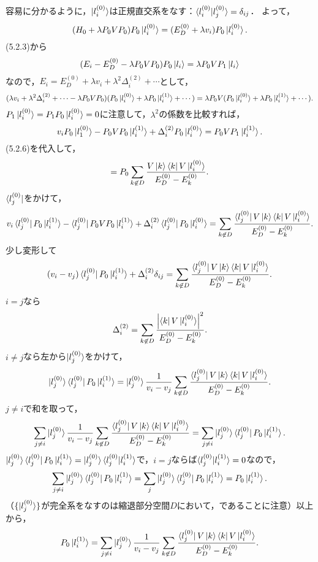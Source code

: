 \documentclass[a4paper]{ltjsreport}
\begin{document}
容易に分かるように，$\ket{l^{(0)}_i}$は正規直交系をなす：$\braket{l_i^{(0)} | l_j^{(0)}} = \delta_{ij}$．
よって，
\[(H_0 + \lambda P_0VP_0) P_0 \ket{l^{(0)}_i} = (E^{(0)}_D + \lambda v_i) P_0 \ket{l^{(0)}_i}.\]
(5.2.3)から
\[(E_i - E_D^{(0)} - \lambda P_0VP_0) P_0 \ket{l_i} =  \lambda P_0VP_1\ket{l_i}\]
なので，$E_i = E_D^{(0)} + \lambda v_i + \lambda^2\Delta_i^{(2)} + \cdots$として，
\[(\lambda v_i + \lambda^2 \Delta_i^{(2)} + \cdots - \lambda P_0VP_0) (P_0\ket{l^{(0)}_i} + \lambda P_0 \ket{l_i^{(1)}} + \cdots) = \lambda P_0V(P_0\ket{l^{(0)}_i} + \lambda P_0\ket{l_i^{(1)}} + \cdots).\]
$P_1\ket{l^{(0)}_i} = P_1P_0\ket{l^{(0)}_i} = 0$に注意して，$\lambda^2$の係数を比較すれば，
\[v_iP_0 \ket{l_1^{(0)}} - P_0VP_0 \ket{l_i^{(1)}} + \Delta_i^{(2)} P_0 \ket{l^{(0)}_i} = P_0VP_1 \ket{l_i^{(1)}}.\]
(5.2.6)を代入して，
\[ = P_0\sum_{k\not\in D} \frac{V \ket{k} \bra{k} V \ket{l^{(0)}_i}}{E_D^{(0)} - E_k^{(0)}}.\]
$\bra{l_j^{(0)}}$をかけて，
\[v_i \bra{l_j^{(0)}} P_0 \ket{l_i^{(1)}} - \bra{l_j^{(0)}} P_0VP_0 \ket{l_i^{(1)}} + \Delta_i^{(2)} \bra{l_j^{(0)}} P_0\ket{l^{(0)}_i} = \sum_{k\not\in D} \frac{\bra{l_j^{(0)}} V\ket{k} \bra{k} V\ket{l^{(0)}_i}}{E_D^{(0)}-E_k^{(0)}}.\]
少し変形して
\[(v_i-v_j) \bra{l_j^{(0)}} P_0 \ket{l_i^{(1)}} + \Delta_i^{(2)} \delta_{ij} = \sum_{k\not\in D} \frac{\bra{l_j^{(0)}} V\ket{k} \bra{k} V \ket{l^{(0)}_i}}{E_D^{(0)} - E_k^{(0)}}.\]
$i = j$なら
\[\Delta_i^{(2)} = \sum_{k\not\in D} \frac{\left\lvert \bra{k} V\ket{l^{(0)}_i}\right\rvert^2}{E_D^{(0)}-E_k^{(0)}}.\]
$i\neq j$なら左から$\ket{l_j^{(0)}}$をかけて，
\[\ket{l_j^{(0)}}\bra{l_j^{(0)}} P_0\ket{l_i^{(1)}} = \ket{l_j^{(0)}}\frac{1}{v_i-v_j} \sum_{k\not\in D} \frac{\bra{l_j^{(0)}} V\ket{k} \bra{k} V\ket{l^{(0)}_i}}{E_D^{(0)} - E_k^{(0)}}.\]
$j\neq i$で和を取って，
\[\sum_{j\neq i} \ket{l_j^{(0)}} \frac{1}{v_i-v_j} \sum_{k\not\in D} \frac{\bra{l_j^{(0)}} V\ket{k} \bra{k} V\ket{l^{(0)}_i}}{E_D^{(0)} - E_k^{(0)}} = \sum_{j\neq i} \ket{l_j^{(0)}}\bra{l_j^{(0)}} P_0 \ket{l_i^{(1)}}.\]
$\ket{l_j^{(0)}}\bra{l_j^{(0)}} P_0\ket{l_i^{(1)}} = \ket{l_j^{(0)}} \braket{l_j^{(0)} | l_i^{(1)}}$で，$i = j$ならば$\braket{l_j^{(0)} | l_i^{(1)}} = 0$なので，
\[\sum_{j\neq i} \ket{l_j^{(0)}} \bra{l_j^{(0)}} P_0 \ket{l_i^{(1)}} = \sum_j \ket{l_j^{(0)}} \bra{l_j^{(0)}} P_0 \ket{l_i^{(1)}} = P_0\ket{l_i^{(1)}}.\]
（$\{\ket{l_j^{(0)}}\}$が完全系をなすのは縮退部分空間$D$において，であることに注意）以上から，
\[P_0 \ket{l_i^{(1)}} = \sum_{j\neq i} \ket{l_j^{(0)}} \frac{1}{v_i-v_j} \sum_{k\not\in D} \frac{\bra{l_j^{(0)}} V \ket{k} \bra{k} V \ket{l^{(0)}_i}}{E_D^{(0)}-E_k^{(0)}}.\]
\end{document}
